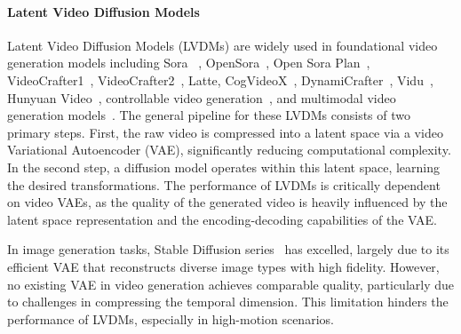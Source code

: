 \paragraph{Latent Video Diffusion Models} 
Latent Video Diffusion Models (LVDMs) are widely used in foundational video generation models including Sora 
~\cite{videoworldsimulators2024}, OpenSora~\cite{opensora}, Open Sora Plan~\cite{pku_yuan_lab_and_tuzhan_ai_etc_2024_10948109}, VideoCrafter1~\cite{he-videocrafter1}, VideoCrafter2~\cite{chen2024videocrafter2overcomingdatalimitations}, Latte\cite{ma2024latte}, CogVideoX~\cite{yang2024cogvideox}, DynamiCrafter~\cite{xing2023dynamicrafter}, Vidu~\cite{bao2024vidu}, Hunyuan Video~\cite{kong2024hunyuanvideo}, controllable video generation~\cite{he-animate-a-story, follow-your-pose, follow-your-emoji}, and multimodal video generation models~\cite{he-seeing-and-hearing, he-llm-survey}.
%
The general pipeline for these LVDMs consists of two primary steps. First, the raw video is compressed into a latent space via a video Variational Autoencoder (VAE), significantly reducing computational complexity. In the second step, a diffusion model operates within this latent space, learning the desired transformations. The performance of LVDMs is critically dependent on video VAEs, as the quality of the generated video is heavily influenced by the latent space representation and the encoding-decoding capabilities of the VAE.


In image generation tasks, Stable Diffusion series~\cite{rombach2022high, podell2023sdxl, sd35} has excelled, largely due to its efficient VAE that reconstructs diverse image types with high fidelity. However, no existing VAE in video generation achieves comparable quality, particularly due to challenges in compressing the temporal dimension. This limitation hinders the performance of LVDMs, especially in high-motion scenarios.

